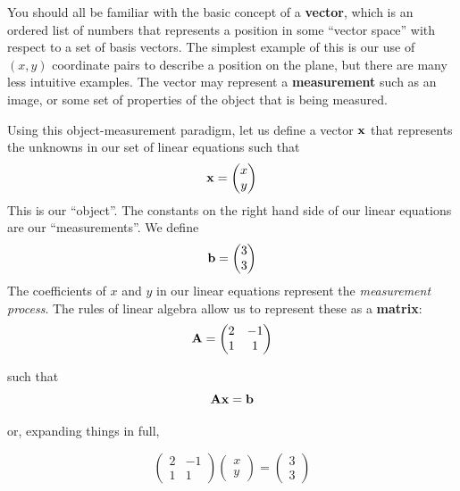 \documentclass[12pt,a4paper]{tufte-handout}
\begin{document}
You should all be familiar with the basic concept of a \textbf{vector}, which is an ordered list of numbers that represents a position in some ``vector space'' with respect to a set of basis vectors. The simplest example of this is our use of $(x,y)$ coordinate pairs to describe a position on the plane, but there are many less intuitive examples. The vector may represent a \textbf{measurement} such as an image, or some set of properties of the object that is being measured.

Using this object-measurement paradigm, let us define a vector $\mathbf{x}$ that represents the unknowns in our set of linear equations such that
\begin{equation}
  \mathbf{x} = \begin{pmatrix}x\\y\end{pmatrix}
\end{equation}
This is our ``object''. The constants on the right hand side of our linear equations are our ``measurements''. We define
\begin{equation}
  \mathbf{b} = \begin{pmatrix}3\\3\end{pmatrix}
\end{equation}
The coefficients of $x$ and $y$ in our linear equations represent the \textit{measurement process}. The rules of linear algebra allow us to represent these as a \textbf{matrix}:
\begin{equation}
  \mathbf{A} = \begin{pmatrix}2&-1\\1&1\end{pmatrix}
\end{equation}

such that 
\begin{equation}
  \mathbf{A}\mathbf{x}=\mathbf{b}
\end{equation}

or, expanding things in full,

\begin{equation}
  \begin{pmatrix}
    2 & -1 \\ 1 & 1
  \end{pmatrix}
  \begin{pmatrix}
    x \\ y
  \end{pmatrix}
  =
  \begin{pmatrix}
    3 \\ 3
  \end{pmatrix}
\end{equation}
\end{document}
